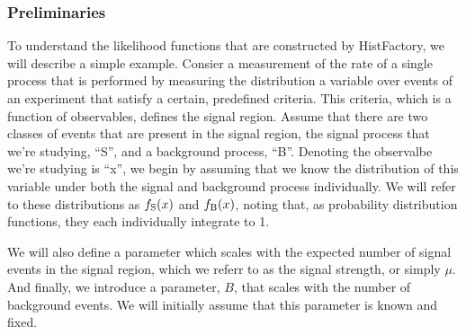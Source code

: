 \subsubsection{Preliminaries}

To understand the likelihood functions that are constructed by HistFactory, we will describe a simple example.
Consier a measurement of the rate of a single process that is performed by measuring the distribution a variable over events of an experiment that satisfy a certain, predefined criteria.
This criteria, which is a function of observables, defines the signal region.
Assume that there are two classes of events that are present in the signal region, the signal process that we're studying, ``S'', and a background process, ``B''.
Denoting the observalbe we're studying is ``x'', we begin by assuming that we know the distribution of this variable under both the signal and background process individually.
We will refer to these distributions as $f_{\rm S}(x)$ and $f_{\rm B}(x)$, noting that, as probability distribution functions, they each individually integrate to 1.

We will also define a parameter which scales with the expected number of signal events in the signal region, which we referr to as the signal strength, or simply $\mu$.
And finally, we introduce a parameter, $B$, that scales with the number of background events.
We will initially assume that this parameter is known and fixed.




